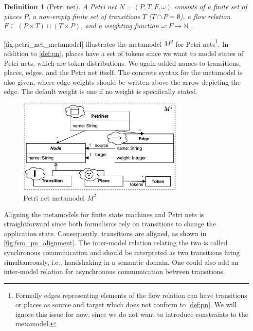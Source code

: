 \documentclass[conference]{IEEEtran}
\newtheorem{definition}{Definition}
\begin{document}
\begin{definition}[Petri net] \label{def:pn}
    A Petri net $N=(P,T,F, \omega)$ consists of a finite set of places $P$, a non-empty finite set of transitions $T$ ($T \cap P = \emptyset $), a flow relation $F \subseteq (P \times T) \cup (T \times P)$, and a weighting function $\omega: F \to \mathbb{N}$ \cite{kunzeBehaviouralModelsModelling2016}. %
\end{definition}

\autoref{fig:petri_net_metamodel} illustrates the metamodel $M^2$ for Petri nets\footnote{Formally edges representing elements of the flow relation can have transitions or places as source and target which does not conform to \autoref{def:pn}.
We will ignore this issue for now, since we do not want to introduce constraints to the metamodel.}.
In addition to \autoref{def:pn}, places have a set of tokens since we want to model states of Petri nets, which are token distributions.
We again added names to transitions, places, edges, and the Petri net itself.
The concrete syntax for the metamodel is also given, where edge weights should be written above the arrow depicting the edge.
The default weight is one if no weight is specifically stated.

\begin{figure}[h]
    \centering
    \includegraphics[width=3.4in]{petri_net_metamodel}
    \caption{Petri net metamodel $M^2$}
    \label{fig:petri_net_metamodel}
\end{figure}

Aligning the metamodels for finite state machines and Petri nets is straightforward since both formalisms rely on transitions to change the application state.
Consequently, transitions are aligned, as shown in \autoref{fig:fsm_pn_alignment}.
The inter-model relation relating the two is called synchronous communication and should be interpreted as two transitions firing simultaneously, i.e., handshaking in a semantic domain.
One could also add an inter-model relation for asynchronous communication between transitions.
\end{document}
